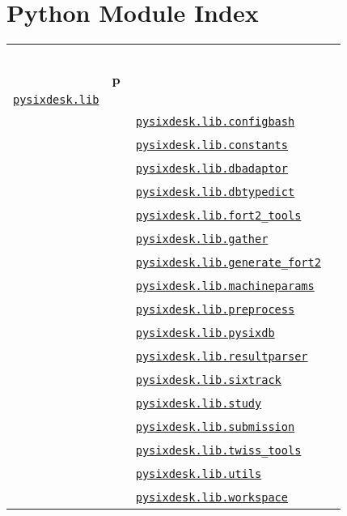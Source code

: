
\providecommand{\tightlist}{%
  \setlength{\itemsep}{0pt}\setlength{\parskip}{0pt}}

\hypertarget{python-module-index}{%
\section{Python Module Index}\label{python-module-index}}


\begin{longtable}[]{@{}lll@{}}
& ~ &\tabularnewline
& \textbf{p} &\tabularnewline
\href{pysixdesk.lib.html\#module-pysixdesk.lib}{\texttt{pysixdesk.lib}}
& \emph{}\tabularnewline
& ~~~
\href{pysixdesk.lib.html\#module-pysixdesk.lib.configbash}{\texttt{pysixdesk.lib.configbash}}
& \emph{}\tabularnewline
& ~~~
\href{pysixdesk.lib.html\#module-pysixdesk.lib.constants}{\texttt{pysixdesk.lib.constants}}
& \emph{}\tabularnewline
& ~~~
\href{pysixdesk.lib.html\#module-pysixdesk.lib.dbadaptor}{\texttt{pysixdesk.lib.dbadaptor}}
& \emph{}\tabularnewline
& ~~~
\href{pysixdesk.lib.html\#module-pysixdesk.lib.dbtypedict}{\texttt{pysixdesk.lib.dbtypedict}}
& \emph{}\tabularnewline
& ~~~
\href{pysixdesk.lib.html\#module-pysixdesk.lib.fort2_tools}{\texttt{pysixdesk.lib.fort2\_tools}}
& \emph{}\tabularnewline
& ~~~
\href{pysixdesk.lib.html\#module-pysixdesk.lib.gather}{\texttt{pysixdesk.lib.gather}}
& \emph{}\tabularnewline
& ~~~
\href{pysixdesk.lib.html\#module-pysixdesk.lib.generate_fort2}{\texttt{pysixdesk.lib.generate\_fort2}}
& \emph{}\tabularnewline
& ~~~
\href{pysixdesk.lib.html\#module-pysixdesk.lib.machineparams}{\texttt{pysixdesk.lib.machineparams}}
& \emph{}\tabularnewline
& ~~~
\href{pysixdesk.lib.html\#module-pysixdesk.lib.preprocess}{\texttt{pysixdesk.lib.preprocess}}
& \emph{}\tabularnewline
& ~~~
\href{pysixdesk.lib.html\#module-pysixdesk.lib.pysixdb}{\texttt{pysixdesk.lib.pysixdb}}
& \emph{}\tabularnewline
& ~~~
\href{pysixdesk.lib.html\#module-pysixdesk.lib.resultparser}{\texttt{pysixdesk.lib.resultparser}}
& \emph{}\tabularnewline
& ~~~
\href{pysixdesk.lib.html\#module-pysixdesk.lib.sixtrack}{\texttt{pysixdesk.lib.sixtrack}}
& \emph{}\tabularnewline
& ~~~
\href{pysixdesk.lib.html\#module-pysixdesk.lib.study}{\texttt{pysixdesk.lib.study}}
& \emph{}\tabularnewline
& ~~~
\href{pysixdesk.lib.html\#module-pysixdesk.lib.submission}{\texttt{pysixdesk.lib.submission}}
& \emph{}\tabularnewline
& ~~~
\href{pysixdesk.lib.html\#module-pysixdesk.lib.twiss_tools}{\texttt{pysixdesk.lib.twiss\_tools}}
& \emph{}\tabularnewline
& ~~~
\href{pysixdesk.lib.html\#module-pysixdesk.lib.utils}{\texttt{pysixdesk.lib.utils}}
& \emph{}\tabularnewline
& ~~~
\href{pysixdesk.lib.html\#module-pysixdesk.lib.workspace}{\texttt{pysixdesk.lib.workspace}}
& \emph{}\tabularnewline
\bottomrule
\end{longtable}

